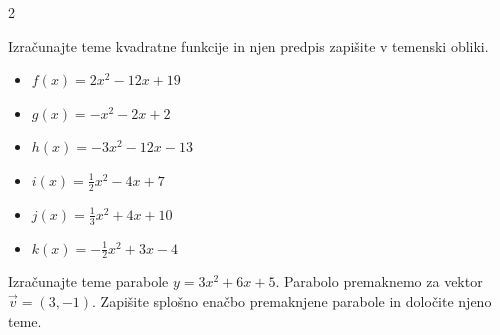         \begin{multicols}{2}
            

        \begin{naloga}
            Izračunajte teme kvadratne funkcije in njen predpis zapišite v temenski obliki.
            

                \begin{itemize}
                    \item $ f(x)=2x^2-12x+19 $ 
                    \item $ g(x)=-x^2-2x+2 $ 
                    \item $ h(x)=-3x^2-12x-13 $ 
                    \item $ i(x)=\frac{1}{2}x^2-4x+7 $ 
                    \item $ j(x)=\frac{1}{3}x^2+4x+10 $ 
                    \item $ k(x)=-\frac{1}{2}x^2+3x-4 $
                \end{itemize}

        \end{naloga}
    


    

        \begin{naloga}
            Izračunajte teme parabole $y=3x^2+6x+5$. 
            Parabolo premaknemo za vektor $\vec{v}=(3,-1)$. 
            Zapišite splošno enačbo premaknjene parabole in določite njeno teme.
            
        \end{naloga}

        ~\\~\\~\\~

        \end{multicols}



